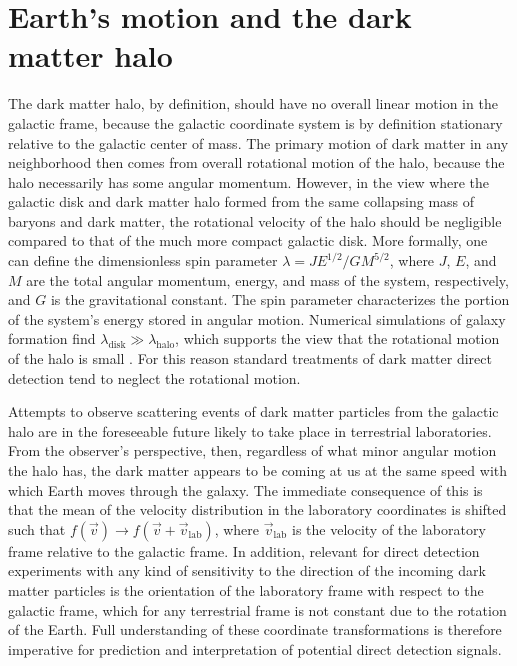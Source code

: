 \section{Earth's motion and the dark matter halo}

The dark matter halo, by definition, should have no overall linear motion in the galactic frame, because the galactic coordinate system is by definition stationary relative to the galactic center of mass. The primary motion of dark matter in any neighborhood then comes from overall rotational motion of the halo, because the halo necessarily has some angular momentum. However, in the view where the galactic disk and dark matter halo formed from the same collapsing mass of baryons and dark matter, the rotational velocity of the halo should be negligible compared to that of the much more compact galactic disk. More formally, one can define the dimensionless spin parameter $\lambda=JE^{1/2}/GM^{5/2}$, where $J$, $E$, and $M$ are the total angular momentum, energy, and mass of the system, respectively, and $G$ is the gravitational constant. The spin parameter characterizes the portion of the system's energy stored in angular motion. Numerical simulations of galaxy formation find $\lambda_\text{disk}\gg\lambda_\text{halo}$, which supports the view that the rotational motion of the halo is small \parencites{MoMaoWhite1998, WarrenEtAl1992, KimmEtAl2011}. For this reason standard treatments of dark matter direct detection tend to neglect the rotational motion.

Attempts to observe scattering events of dark matter particles from the galactic halo are in the foreseeable future likely to take place in terrestrial laboratories. From the observer's perspective, then, regardless of what minor angular motion the halo has, the dark matter appears to be coming at us at the same speed with which Earth moves through the galaxy. The immediate consequence of this is that the mean of the velocity distribution in the laboratory coordinates is shifted such that $f(\vec{v})\rightarrow f(\vec{v}+\vec{v}_\text{lab})$, where $\vec{v}_\text{lab}$ is the velocity of the laboratory frame relative to the galactic frame. In addition, relevant for direct detection experiments with any kind of sensitivity to the direction of the incoming dark matter particles is the orientation of the laboratory frame with respect to the galactic frame, which for any terrestrial frame is not constant due to the rotation of the Earth. Full understanding of these coordinate transformations is therefore imperative for prediction and interpretation of potential direct detection signals.

